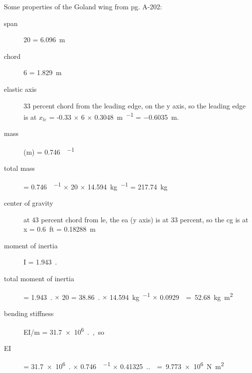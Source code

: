 \documentclass[11pt,openany,twoside]{book}
\numberwithin{equation}{section}		%
\let\US\SI
\begin{document}
Some properties of the Goland wing from \cite{goland1945flutter} pg. A-202:
\begin{description}
\item[span] \US{20}{\ft} = \SI{6.096}{m}
\item[chord] \US{6}{\ft} = \SI{1.829}{m}
\item[elastic axis] 33 percent chord from the leading edge, on the y axis, so
	the leading edge is at
	\newline
	$x_{le}$ = -0.33 $\times$ \qty{6}{\ft} $\times$ \qty[per-mode=symbol]{0.3048}{\m\per\ft}
	= \qty{-0.6035}{\m}.
\item[mass] (m) = \qty[per-mode = symbol]{0.746}{\slug\per\ft}
\item[total mass] = \qty[per-mode = symbol]{0.746}{\slug\per\ft}
		$\times$ \qty{20}{\ft}
		$\times$ \qty[per-mode = symbol]{14.594}{\kg\per\slug} = \qty{217.74}{\kg}

\item[center of gravity] at 43 percent chord from le, the ea (y axis) is at
	33 percent, so the cg is at x = \US{0.6}{ft} = \SI{0.18288}{m}

\item[moment of inertia] I = \qty[per-mode = symbol]{1.943}{\slug.\square\ft\per\ft}
\item[total moment of inertia] = \qty[per-mode = symbol]{1.943}{\slug.\square\ft\per\ft}
	$\times$ \qty{20}{\ft} = \qty[per-mode = symbol]{38.86}{\slug.\square\ft}
	$\times$ \qty[per-mode = symbol]{14.594}{\kg\per\slug}
	$\times$ \qty[per-mode = symbol]{0.0929}{\square\metre\per\square\ft}
	= \qty{52.68}{\kg\square\meter}

\item[bending stiffness] EI/m = \US{31.7e+6}{\lb.\cubic\ft\per\slug}, so
\item[EI] = \US{31.7e+6}{\lb.\cubic\ft\per\slug}
		$\times$ \qty[per-mode = symbol]{0.746}{\slug\per\ft}
		$\times$ \qty[per-mode = symbol]{0.41325}{\N.\square\m\per\lb.\square\ft}
		\newline = \qty{9.773e+6}{\N.\square\m}


\end{description}
\end{document}
